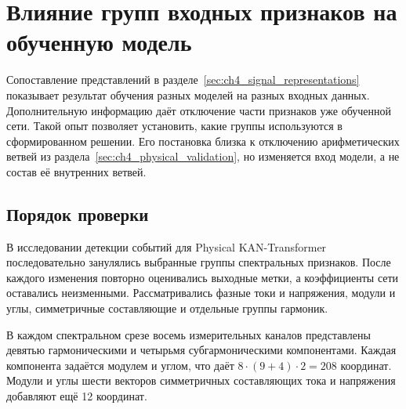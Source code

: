 \section{Влияние групп входных признаков на обученную модель}
\label{sec:ch4_input_sensitivity}

{}

Сопоставление представлений в разделе~\ref{sec:ch4_signal_representations}
показывает результат обучения разных моделей
на разных входных данных. Дополнительную информацию
даёт отключение части признаков уже обученной сети.
Такой опыт позволяет установить, какие группы
используются в сформированном решении.
Его постановка близка к отключению арифметических
ветвей из раздела~\ref{sec:ch4_physical_validation},
но изменяется вход модели, а не состав её внутренних ветвей.

\subsection{Порядок проверки}
\label{sec:ch4_input_sensitivity_protocol}


В исследовании детекции событий для Physical KAN-Transformer
последовательно занулялись выбранные группы
спектральных признаков. После каждого изменения
повторно оценивались выходные метки,
а коэффициенты сети оставались неизменными.
Рассматривались фазные токи и напряжения,
модули и углы, симметричные составляющие
и отдельные группы гармоник.

В каждом спектральном срезе восемь измерительных каналов представлены девятью
гармоническими и четырьмя субгармоническими компонентами. Каждая компонента задаётся
модулем и углом, что даёт $8\cdot(9+4)\cdot2=208$ координат. Модули и углы шести
векторов симметричных составляющих тока и напряжения добавляют ещё 12 координат.

